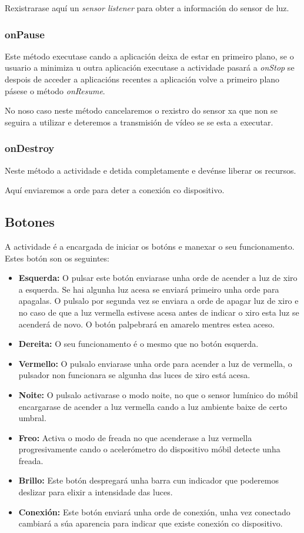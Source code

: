 Rexistrarase aquí un \emph{sensor listener} para obter a información do sensor de luz.
\subsubsection{onPause}
Este método executase cando a aplicación deixa de estar en primeiro plano, se o usuario a minimiza u outra aplicación executase a actividade pasará a \emph{onStop} se despois de acceder a aplicacións recentes a aplicación volve a primeiro plano pásese o método \emph{onResume}.

No noso caso neste método cancelaremos o rexistro do sensor xa que non se seguira a utilizar e deteremos a transmisión de vídeo se se esta a executar.
\subsubsection{onDestroy}
Neste método a actividade e detida completamente e devénse liberar os recursos.

Aquí enviaremos a orde para deter a conexión co dispositivo.

\subsection{Botones}
A actividade é a encargada de iniciar os botóns e manexar o seu funcionamento. Estes botón son os seguintes:
\begin{itemize}
    \item \textbf{Esquerda:} O pulsar este botón enviarase unha orde de acender a luz de xiro a esquerda. Se hai algunha luz acesa se enviará primeiro unha orde para apagalas. O pulsalo por segunda vez se enviara a orde de apagar luz de xiro e no caso de que a luz vermella estivese acesa antes de indicar o xiro esta luz se acenderá de novo. O botón palpebrará en amarelo mentres estea aceso.
    \item \textbf{Dereita:} O seu funcionamento é o mesmo que no botón esquerda.
    \item \textbf{Vermello:} O pulsalo enviarase unha orde para acender a luz de vermella, o pulsador non funcionara se algunha das luces de xiro está acesa.
    \item \textbf{Noite:} O pulsalo activarase o modo noite, no que o sensor lumínico do móbil encargarase de acender a luz vermella cando a luz ambiente baixe de certo umbral.
    \item \textbf{Freo:} Activa o modo de freada no que acenderase a luz vermella progresivamente cando o acelerómetro do dispositivo móbil detecte unha freada.
    \item \textbf{Brillo:} Este botón despregará unha barra cun indicador que poderemos deslizar para elixir a intensidade das luces.
    \item \textbf{Conexión:} Este botón enviará unha orde de conexión, unha vez conectado cambiará a súa aparencia para indicar que existe conexión co dispositivo.
\end{itemize}
